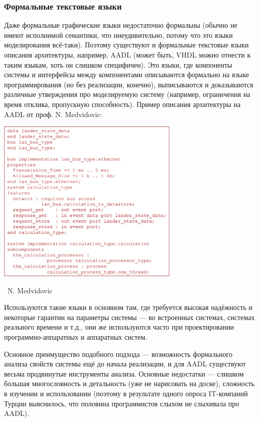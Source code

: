 \documentclass[a5paper]{article}
\newcommand{\attribution}[1] {
	\vspace{-5mm}\begin{flushright}\begin{scriptsize}%
	{\textcopyright\, #1}\end{scriptsize}\end{flushright}
}
\begin{document}
\subsubsection{Формальные текстовые языки}

Даже формальные графические языки недостаточно формальны (обычно не имеют исполнимой семантики, что ннеудивительно, потому что это языки моделирования всё-таки). Поэтому существуют и формальные текстовые языки описания архитектуры, например, AADL (может быть, VHDL можно отнести к таким языкам, хоть он слишком специфичен). Это языки, где компоненты системы и интерфейсы между компонентами описываются формально на языке программирования (но без реализации, конечно), выписываются и доказываются различные утверждения про моделируемую систему (например, ограничения на время отклика, пропускную способность). Пример описания архитектуры на AADL от проф. N. Medvidovic:

\begin{center}
	\includegraphics[width=0.65\textwidth]{aadl.png}
	\attribution{N. Medvidovic}
\end{center}

Используются такие языки в основном там, где требуется высокая надёжность и некоторые гарантии на параметры системы --- во встроенных системах, системах реального времени и т.д., они же используются часто при проектировании программно-аппаратных и аппаратных систем.

Основное преимущество подобного подхода --- возможность формального анализа свойств системы ещё до начала реализации, и для AADL существуют весьма продвинутые инструменты анализа. Основные недостатки --- слишком большая многословность и детальность (уже не нарисовать на доске), сложность в изучении и использовании (поэтому в результате одного опроса IT-компаний Турции выяснилось, что половина программистов слыхом не слыхивала про AADL).
\end{document}
